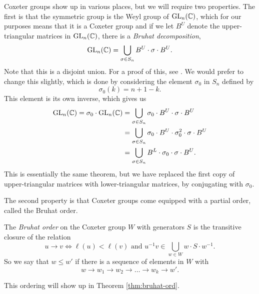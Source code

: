 Coxeter groups show up in various places, but we will require two
properties. The first is that the symmetric group is the Weyl group of
$\operatorname{GL}_n(\mathbb{C})$, which for our purposes means that it is a Coxeter group
and if we let $B^U$ denote the upper-triangular matrices in
$\operatorname{GL}_n(\mathbb{C})$, there is a \textit{Bruhat decomposition},
\[ \operatorname{GL}_n(\mathbb{C}) = \bigcup_{\sigma \in S_n} B^U \cdot \sigma \cdot B^U. \]
Note that this is a disjoint union. For a proof of this, see
\cite[Theorem 4.3]{hiller}. We
would prefer to change this slightly, which is done by considering the
element $\sigma_0$ in $S_n$ defined by
\[ \sigma_0(k) = n+1-k. \]
This element is its own inverse, which gives us
\begin{align*}
  \operatorname{GL}_n(\mathbb{C}) = \sigma_0 \cdot \operatorname{GL}_n(\mathbb{C}) &= \bigcup_{\sigma\in S_n}
                                         \sigma_0\cdot B^U \cdot
                                         \sigma\cdot B^U \\
                                       &= \bigcup_{\sigma\in S_n}
                                         \sigma_0\cdot B^U \cdot
                                         \sigma_0^2\cdot \sigma \cdot
                                         B^U \\
                                       &= \bigcup_{\sigma\in S_n}
                                         B^L\cdot \sigma_0\cdot
                                         \sigma\cdot B^U.
\end{align*}
This is essentially the same theorem, but we have replaced the first
copy of upper-triangular matrices with lower-triangular matrices, by
conjugating with $\sigma_0$.

The second property is that Coxeter groups come equipped with a
partial order, called the Bruhat order.
\begin{definition}
  \label{def:bruhat-def}
  The \textit{Bruhat order} on the Coxeter group $W$ with generators
  $S$ is the transitive closure of the relation
  \[ u \to v \iff \ell(u) < \ell(v) \text{ and } u^{-1}v \in
  \bigcup_{w\in W} w
  \cdot S \cdot w^{-1}. \]
  So we say that $w \leq w'$ if there is a sequence of elements in $W$
  with
  \[ w \to w_1 \to w_2 \to \dots \to w_k \to w'. \]
\end{definition}

This ordering will show up in Theorem \ref{thm:bruhat-ord}.

